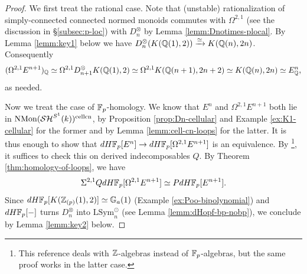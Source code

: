 \documentclass{amsart}
\numberwithin{proposition}{section}
\numberwithin{equation}{section}
\def\cell{\mathrm{cell}}
\def\LSym{\mathrm{LSym}}
\def\NMon{\mathrm{NMon}}
\def\cn{\mathrm{cn}}
\newcommand{\Ga}{{\mathbb{G}_a}}
\def\dHFp{dH\F_p}
\def\hotimes{\odot}
\begin{document}
\begin{proof}
We first treat the rational case.
Note that (unstable) rationalization of simply-connected connected normed monoids commutes with $\Omega^{2,1}$ (see the discussion in \S\ref{subsec:p-loc}) with $D_n^\otimes$ by Lemma \ref{lemm:Dnotimes-plocal}.
By Lemma \ref{lemm:key1} below we have $D_n^\otimes(K(\mathbb{Q}(1),2)) \xrightarrow{\simeq} K(\mathbb{Q}(n),2n)$.
Consequently \[ (\Omega^{2,1} E^{n+1})_{\mathbb{Q}} \simeq \Omega^{2,1} D_{n+1}^\otimes K(\mathbb{Q}(1),2) \simeq \Omega^{2,1} K(\mathbb{Q}(n+1),2n+2) \simeq K(\mathbb{Q}(n),2n) \simeq E^n_{\mathbb{Q}}, \] as needed.

Now we treat the case of $\mathbb{F}_p$-homology.
We know that $E^n$ and $\Omega^{2,1}E^{n+1}$ both lie in $\NMon(\SH^{S^1}(k))^{\cell\cn}$, by Proposition \ref{prop:Dn-cellular} and Example \ref{ex:K1-cellular} for the former and by Lemma \ref{lemm:cell-cn-loops} for the latter.
It is thus enough to show that $\dHFp[E^n] \to \dHFp[\Omega^{2,1}E^{n+1}]$ is an equivalence.
By \cite[Lemma 2.11]{brantner2025formal}\footnote{This reference deals with $\mathbb{Z}$-algebras instead of $\mathbb{F}_p$-algebras, but the same proof works in the latter case.}, it suffices to check this on derived indecomposables $Q$.
By Theorem \ref{thm:homology-of-loops}, we have \[ \Sigma^{2,1}Q\dHFp[\Omega^{2,1}E^{n+1}] \wequi P\dHFp[E^{n+1}]. \]
Since $\dHFp[K(\Z_{(p)}(1),2)] \wequi \Ga(1)$ (Example \ref{ex:Poo-bipolynomial}) and $\dHFp[\ph]$ turns $D_n^\otimes$ into $\LSym_n^\hotimes$ (see Lemma \ref{lemm:dHopf-bp-nobp}), we conclude by Lemma \ref{lemm:key2} below.
\end{proof}
\end{document}
